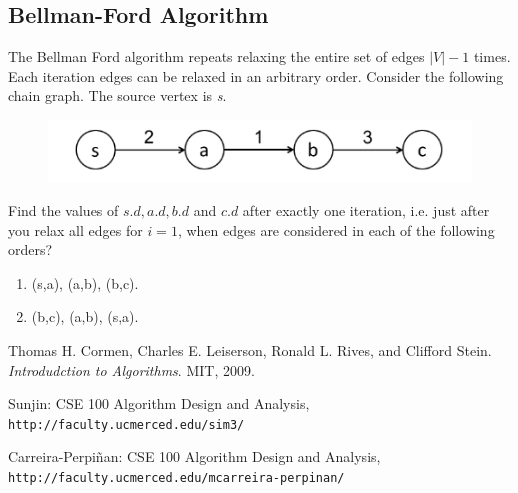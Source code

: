 \documentclass[11pt,fleqn]{book}
\begin{document}
\subsection{Bellman-Ford Algorithm}
\begin{example}
The Bellman Ford algorithm repeats relaxing the entire set of edges $|V| - 1$ times. Each iteration edges can be relaxed in an arbitrary order. Consider the following chain graph. The source vertex is \textit{s}.
\begin{figure}[H]
    \centering
    \includegraphics{Pictures/bfaChainG.PNG}
    \label{fig:my_label}
\end{figure}
Find the values of $s.d, a.d, b.d$ and $c.d$ after exactly one iteration, i.e. just after you relax all edges for $i = 1$, when edges are considered in each of the following orders? 
\begin{enumerate}[label=(\alph*)]
    \item (s,a), (a,b), (b,c).
    \item (b,c), (a,b), (s,a).
\end{enumerate}
\end{example}


\begin{thebibliography}{9}
Thomas H. Cormen, Charles E. Leiserson, Ronald L. Rives, and Clifford Stein. 
\textit{Introdudction to Algorithms}. 
MIT, 2009.
 
Sunjin: CSE 100 Algorithm Design and Analysis,
\\\texttt{http://faculty.ucmerced.edu/sim3/}

Carreira-Perpiñan: CSE 100 Algorithm Design and Analysis,
\\\texttt{http://faculty.ucmerced.edu/mcarreira-perpinan/}

\end{thebibliography}


\end{document}
